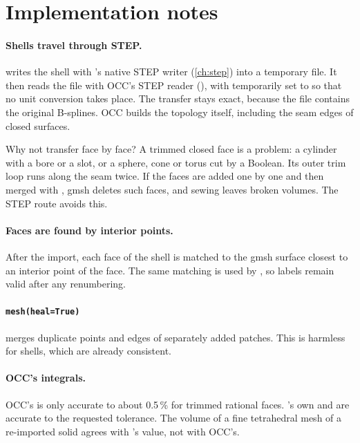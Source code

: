 \section{Implementation notes}\label{sec:mesh-impl}

\paragraph{Shells travel through STEP.}  writes the shell with \NF{}'s native
STEP writer (\cref{ch:step}) into a temporary file. It then reads the file with OCC's STEP
reader (), with  temporarily set to
 so that no unit conversion takes place. The transfer stays exact, because the file
contains the original B-splines. OCC builds the topology itself, including the seam edges of
closed surfaces.

Why not transfer face by face? A trimmed closed face is a problem: a cylinder with a bore or a
slot, or a sphere, cone or torus cut by a Boolean. Its outer trim loop runs along the seam
twice. If the faces are added one by one and then merged with ,
gmsh deletes such faces, and sewing leaves broken volumes. The STEP route avoids this.

\paragraph{Faces are found by interior points.} After the import, each face of the shell is
matched to the gmsh surface closest to an interior point of the face. The same matching is
used by , so labels remain valid after any renumbering.

\paragraph{\texttt{mesh(heal=True)}} merges duplicate points and edges of separately added
patches. This is harmless for shells, which are already consistent.

\paragraph{OCC's integrals.} OCC's  is only accurate to about 0.5\,\% for
trimmed rational faces. \NF{}'s own  and  are accurate to the
requested tolerance. The volume of a fine tetrahedral mesh of a re-imported solid agrees with
\NF{}'s value, not with OCC's.

